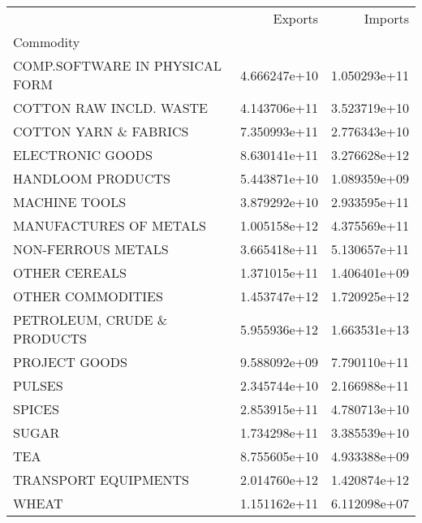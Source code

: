 \begin{tabular}{lrr}
\toprule
{} &       Exports &       Imports \\
Commodity                      &               &               \\
\midrule
COMP.SOFTWARE IN PHYSICAL FORM &  4.666247e+10 &  1.050293e+11 \\
COTTON RAW INCLD. WASTE        &  4.143706e+11 &  3.523719e+10 \\
COTTON YARN \& FABRICS          &  7.350993e+11 &  2.776343e+10 \\
ELECTRONIC GOODS               &  8.630141e+11 &  3.276628e+12 \\
HANDLOOM PRODUCTS              &  5.443871e+10 &  1.089359e+09 \\
MACHINE TOOLS                  &  3.879292e+10 &  2.933595e+11 \\
MANUFACTURES OF METALS         &  1.005158e+12 &  4.375569e+11 \\
NON-FERROUS METALS             &  3.665418e+11 &  5.130657e+11 \\
OTHER CEREALS                  &  1.371015e+11 &  1.406401e+09 \\
OTHER COMMODITIES              &  1.453747e+12 &  1.720925e+12 \\
PETROLEUM, CRUDE \& PRODUCTS    &  5.955936e+12 &  1.663531e+13 \\
PROJECT GOODS                  &  9.588092e+09 &  7.790110e+11 \\
PULSES                         &  2.345744e+10 &  2.166988e+11 \\
SPICES                         &  2.853915e+11 &  4.780713e+10 \\
SUGAR                          &  1.734298e+11 &  3.385539e+10 \\
TEA                            &  8.755605e+10 &  4.933388e+09 \\
TRANSPORT EQUIPMENTS           &  2.014760e+12 &  1.420874e+12 \\
WHEAT                          &  1.151162e+11 &  6.112098e+07 \\
\bottomrule
\end{tabular}
